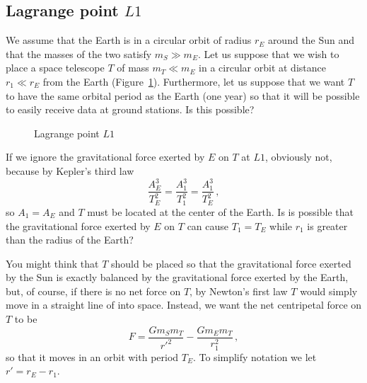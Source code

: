 \subsection{Lagrange point $L1$}

We assume that the Earth is in a circular orbit of radius $r_E$ around the Sun and that the masses of the two satisfy $m_S \gg m_E$. Let us suppose that we wish to place a space telescope $T$ of mass $m_T \ll m_E$ in a circular orbit at distance $r_1\ll r_E$ from the Earth (Figure~\ref{f.lagrange1}). Furthermore, let us suppose that we want $T$ to have the same orbital period as the Earth (one year) so that it will be possible to easily receive data at ground stations. Is this possible?

\begin{figure}
\begin{center}
\end{center}
\caption{Lagrange point $L1$}\label{f.lagrange1}
\end{figure}
If we ignore the gravitational force exerted by $E$ on $T$ at $L1$, obviously not, because by Kepler's third law
\[
\frac{A_E^3}{T_E^2} = \frac{A_1^3}{T_1^2}=\frac{A_1^3}{T_E^2}\,,
\]
so $A_1=A_E$ and $T$ must be located at the center of the Earth. Is is possible that the gravitational force exerted by $E$ on $T$ can cause $T_1=T_E$ while $r_1$ is greater than the radius of the Earth?

You might think that $T$ should be placed so that the gravitational force exerted by the Sun is exactly balanced by the gravitational force exerted by the Earth, but, of course, if there is no net force on $T$, by Newton's first law $T$ would simply move in a straight line of into space. Instead, we want the net centripetal force on $T$ to be
\begin{equation}
F = \frac{Gm_Sm_T}{r'^2}-\frac{Gm_Em_T}{r_1^2}\,,\label{eqn.force-diff}
\end{equation}
so that it moves in an orbit with period $T_E$. To simplify notation we let $r'=r_E-r_1$.

